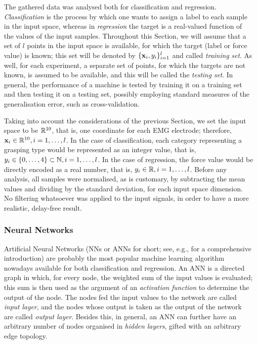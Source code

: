 The gathered data was analysed both for classification and
regression. \emph{Classification} is the process by which one wants to
assign a label to each sample in the input space, whereas in
\emph{regression} the target is a real-valued function of the values
of the input samples. Throughout this Section, we will assume that a
set of $l$ points in the input space is available, for which the
target (label or force value) is known; this set will be denoted by
$\{\mathbf{x}_i,y_i\}_{i=1}^l$ and called \emph{training set}. As well, for
each experiment, a separate set of points, for which the targets are
not known, is assumed to be available, and this will be called the
\emph{testing set}. In general, the performance of a machine is tested
by training it on a training set and then testing it on a testing set,
possibly employing standard measures of the generalisation error, such
as cross-validation.

Taking into account the considerations of the previous Section, we set
the input space to be $\mathbb{R}^{10}$, that is, one coordinate for each EMG
electrode; therefore, $\mathbf{x}_i \in \mathbb{R}^{10}, i=1,\ldots,l$. In the case
of classification, each category representing a grasping type would be
represented as an integer value, that is, $y_i \in \{0,\ldots,4\}
\subset \mathbb{N}, i=1,\ldots,l$. In the case of regression, the force value
would be directly encoded as a real number, that is, $y_i \in \mathbb{R},
i=1,\ldots,l$. Before any analysis, all samples were normalised, as is
customary, by subtracting the mean values and dividing by the standard
deviation, for each input space dimension. No filtering whatsoever was
applied to the input signals, in order to have a more realistic,
delay-free result.

\subsubsection{Neural Networks}

Artificial Neural Networks (NNs or ANNs for short; see, e.g.,
\cite{bishop} for a comprehensive introduction) are probably the most
popular machine learning algorithm nowadays available for both
classification and regression. An ANN is a directed graph in which,
for every node, the weighted sum of the input values is evaluated;
this sum is then used as the argument of an \emph{activation function}
to determine the output of the node. The nodes fed the input values to
the network are called \emph{input layer}, and the nodes whose output
is taken as the output of the network are called \emph{output
layer}. Besides this, in general, an ANN can further have an arbitrary
number of nodes organised in \emph{hidden layers}, gifted with an
arbitrary edge topology.

